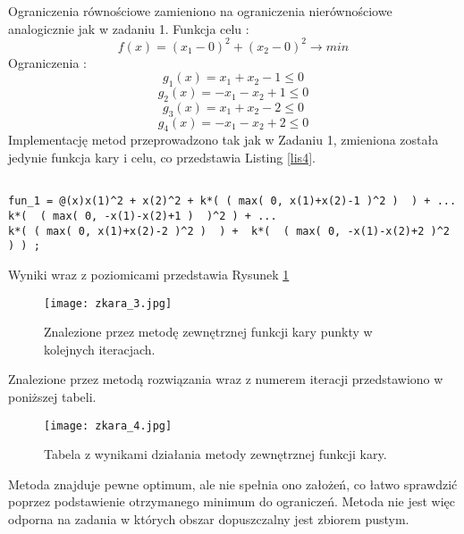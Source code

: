 \documentclass[a4paper,15pt]{article}
\begin{document}
Ograniczenia równościowe zamieniono na ograniczenia nierównościowe analogicznie jak w zadaniu 1. 
Funkcja celu : 
\begin{equation*}
f(x) = (x_{1}-0)^{2}+(x_{2}-0)^{2} \rightarrow min
\end{equation*}
Ograniczenia :
\begin{equation*}
g_{1}(x) = x_{1} + x_{2} -1 \leq 0
\end{equation*}
\begin{equation*}
g_{2}(x) = -x_{1} - x_{2} + 1 \leq 0
\end{equation*}
\begin{equation*}
g_{3}(x) = x_{1} + x_{2} - 2 \leq 0
\end{equation*}
\begin{equation*}
g_{4}(x) = -x_{1} - x_{2} + 2 \leq 0
\end{equation*}
Implementację metod przeprowadzono tak jak w Zadaniu 1, zmieniona została jedynie funkcja kary i celu, co przedstawia Listing \ref{lis4}.
\begin{lstlisting}[caption=Funkcja celu dla zadania 2, captionpos=b,
label=lis4, firstnumber=12,frame=single]

fun_1 = @(x)x(1)^2 + x(2)^2 + k*( ( max( 0, x(1)+x(2)-1 )^2 )  ) + ...
k*(  ( max( 0, -x(1)-x(2)+1 )  )^2 ) + ...
k*( ( max( 0, x(1)+x(2)-2 )^2 )  ) +  k*(  ( max( 0, -x(1)-x(2)+2 )^2 ) ) ;
\end{lstlisting}

 

Wyniki wraz z poziomicami przedstawia Rysunek \ref{fig:zkara_3}
\begin{figure}[H]
\centerline{\texttt{[image: zkara\_3.jpg]}}
\centering
\caption{Znalezione przez metodę zewnętrznej funkcji kary punkty w kolejnych iteracjach.}
\label{fig:zkara_3}
\end{figure}

\newpage
Znalezione przez metodą rozwiązania wraz z numerem iteracji przedstawiono w poniższej tabeli. 

\begin{figure}[H]
\centerline{\texttt{[image: zkara\_4.jpg]}}
\centering
\caption{Tabela z wynikami działania metody zewnętrznej funkcji kary.}
\label{fig:zkara_4}
\end{figure}


Metoda znajduje pewne optimum, ale nie spełnia ono założeń, co łatwo sprawdzić poprzez podstawienie otrzymanego minimum do ograniczeń. Metoda nie jest więc odporna na zadania w których obszar dopuszczalny jest zbiorem pustym.
\end{document}
